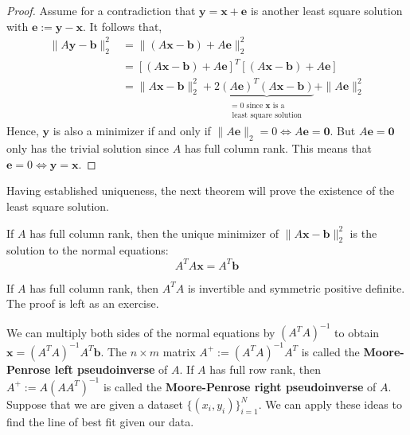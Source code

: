 \begin{proof}
	Assume for a contradiction that $\mathbf{y} = \mathbf{x} + \mathbf{e}$ is another least square solution with $\mathbf{e} := \mathbf{y} - \mathbf{x}$. It follows that,
	\[\begin{aligned}\|A \boldsymbol{y}-\boldsymbol{b}\|_2^2 &=\|(A \boldsymbol{x}-\boldsymbol{b})+A \boldsymbol{e}\|_2^2 \\ &=[(A \boldsymbol{x}-\boldsymbol{b})+A \boldsymbol{e}]^T[(A \boldsymbol{x}-\boldsymbol{b})+A \boldsymbol{e}] \\ &=\|A \boldsymbol{x}-\boldsymbol{b}\|_2^2+2 \underbrace{(A \boldsymbol{e})^T(A \boldsymbol{x}-\boldsymbol{b})}_{\begin{array}{c}=0 \text { since } \boldsymbol{x} \text { is a } \\ \text { least square solution }\end{array}}+\|A \boldsymbol{e}\|_2^2 \end{aligned}\]
	Hence, $\mathbf{y}$ is also a minimizer if and only if $\|A \boldsymbol{e}\|_2=0 \Leftrightarrow A \boldsymbol{e}=\mathbf{0}$. But $A \mathbf{e} = \mathbf{0}$ only has the trivial solution since $A$ has full column rank. This means that $\mathbf{e} = 0 \iff \mathbf{y} = \mathbf{x}$.
\end{proof}

\NewLine

\noindent Having established uniqueness, the next theorem will prove the existence of the least square solution.

\NewLine

\begin{thm}
	If $A$ has full column rank, then the unique minimizer of $\|A \mathbf{x} - \mathbf{b}\|^2_2$ is the solution to the normal equations:
	\[A^T A \mathbf{x} = A^T \mathbf{b}\]
\end{thm}

\begin{rmk}
	If $A$ has full column rank, then $A^T A$ is invertible and symmetric positive definite. The proof is left as an exercise.
\end{rmk}

We can multiply both sides of the normal equations by $(A^T A)^{-1}$ to obtain $\mathbf{x} = (A^T A)^{-1} A^T \mathbf{b}$. The $n \times m$ matrix $A^+ := (A^T A)^{-1} A^T$ is called the \textbf{Moore-Penrose left pseudoinverse} of $A$. If $A$ has full row rank, then $A^+ := A(A A^T)^{-1}$ is called the \textbf{Moore-Penrose right pseudoinverse} of $A$. Suppose that we are given a dataset $\{(x_i, y_i)\}_{i = 1}^N$. We can apply these ideas to find the line of best fit given our data.

